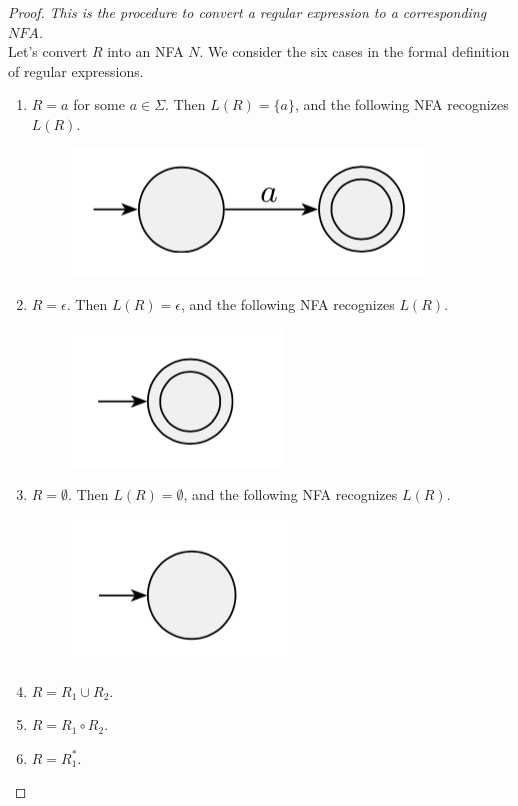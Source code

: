 \documentclass[11pt]{article}
\theoremstyle{definition}
\begin{document}
\begin{proof}
\textit{This is the procedure to convert a regular expression to a corresponding $NFA$.}\\
Let's convert $R$ into an NFA $N$. We consider the six cases in the formal definition of regular expressions.
\begin{enumerate}
    \item $R = a$ for some $a \in\Sigma$. Then $L(R) = \{a\}$, and the following NFA recognizes $L(R)$.
    \begin{figure}[h]
	\centering
	\includegraphics[width=0.3\linewidth]{proc1.png}
	\label{fig}
\end{figure}

    \item $R=\epsilon$. Then $L(R)=\epsilon$, and the following NFA recognizes $L(R)$.
        \begin{figure}[H]
	\centering
	\includegraphics[width=0.2\linewidth]{proc2.png}
	\label{fig}
\end{figure}

    \item $R=\emptyset$. Then $L(R)=\emptyset$, and the following NFA recognizes $L(R)$.
    \begin{figure}[H]
	\centering
	\includegraphics[width=0.2\linewidth]{proc3.png}
	\label{fig}
    \end{figure}

    \item $R = R_1\cup R_2$.
    \item $R = R_1\circ R_2$.
    \item $R = R_1^*$.
\end{enumerate}
\end{proof}
\end{document}
